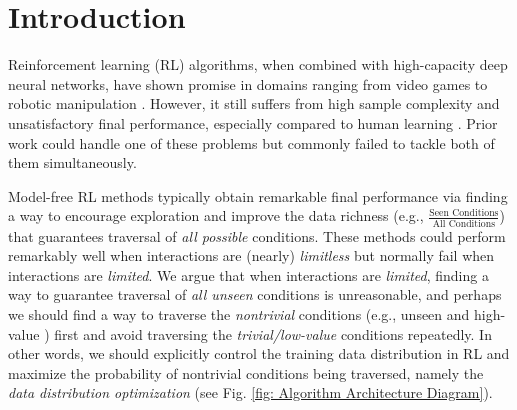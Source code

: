 \documentclass[nohyperref]{article}
\theoremstyle{plain}
\begin{document}
\begin{figure*}[!t]
    \centering
	\centering
	\caption{Algorithm Architecture Diagram. \textbf{(a)} The Isomorphism architecture of GDI, wherein the  behavior policy space (e.g., the soft entropy policy space, $\pi_{\theta_{\lambda}}=\epsilon \cdot \operatorname{Softmax}\left(\frac{A_{\theta_1}}{\tau_{1}}\right)+(1-\epsilon) \cdot \operatorname{Softmax}\left(\frac{A_{\theta_2}}{\tau_{2}}\right)$) is constructed by the base policy  with shared parameters (i.e., $\theta_1=\theta_2=\theta$) and indexed by $\lambda=(\tau_1,\tau_2,\epsilon)$. \textbf{(b)} The Heterogeneous architecture of GDI, wherein the behavior policy space is constructed by the base policy  with different parameters (i.e., $\theta_1 \neq \theta_2$) and indexed by $\lambda$. For more details, can see Sec. \ref{Sec: Methodology} and \ref{sec: experiment}.} 
	\label{fig: Algorithm Architecture Diagram}
\end{figure*}





\section{Introduction}
\label{sec: introduction}


Reinforcement learning (RL) algorithms, when combined with high-capacity deep neural networks, have shown promise in domains ranging from video games \citep{dqn} to robotic manipulation \citep{trpo,ppo}. However, it still suffers from high sample complexity and unsatisfactory final performance, especially compared to human learning \citep{tsividis2017human}. Prior work could handle one of these problems but commonly failed to tackle both of them simultaneously.


Model-free RL methods typically obtain remarkable final performance via finding a way to encourage exploration and  improve the data richness (e.g., $\frac{\text{Seen Conditions}}{\text{All Conditions}}$) that guarantees traversal of \emph{all possible} conditions. These methods \citep{goexplore,agent57} could perform remarkably well when interactions are (nearly) \emph{limitless} but normally fail when  interactions are \emph{limited}. We argue that when interactions are \emph{limited}, finding a way to guarantee traversal of \emph{all unseen} conditions is unreasonable, and perhaps we should find a way to traverse the \emph{nontrivial} conditions (e.g., unseen \citep{goexplore} and high-value \citep{discor}) first and avoid traversing the \emph{trivial/low-value} conditions repeatedly. In other words, we should explicitly control the training data distribution in RL and maximize the probability of nontrivial conditions being traversed, namely the \emph{data distribution optimization} (see Fig. \ref{fig: Algorithm Architecture Diagram}). 
\end{document}
